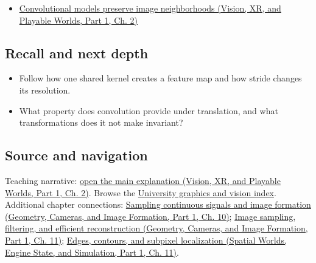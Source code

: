\hypertarget{appendix-47c51ea026fb-full-teaching-explanation}{}

\begin{itemize}
\tightlist
\item
  \href{../07-Vision-XR-and-Playable-Worlds-P01/main.pdf\#nameddest=04-visual-computing-ii-ch031-convolutional-models-preserve-image-neighborhoods}{Convolutional models preserve image neighborhoods (Vision, XR, and Playable Worlds, Part 1, Ch. 2)}
\end{itemize}

\subsection{Recall and next depth}\label{appendix-47c51ea026fb-recall-and-next-depth}

\hypertarget{appendix-47c51ea026fb-recall-and-next-depth}{}

\begin{itemize}
\tightlist
\item
  Follow how one shared kernel creates a feature map and how stride changes its resolution.
\item
  What property does convolution provide under translation, and what transformations does it not make invariant?
\end{itemize}

\subsection{Source and navigation}\label{appendix-47c51ea026fb-source-and-navigation}

\hypertarget{appendix-47c51ea026fb-source-and-navigation}{}

Teaching narrative: \href{../07-Vision-XR-and-Playable-Worlds-P01/main.pdf\#nameddest=04-visual-computing-ii-ch031-convolutional-models-preserve-image-neighborhoods}{open the main explanation (Vision, XR, and Playable Worlds, Part 1, Ch. 2)}. Browse the \hyperref[appendix-a6d556a4ef50-university-graphics-vision-and-photography---independent-series]{University graphics and vision index}. Additional chapter connections: \href{../03-Geometry-Cameras-and-Image-Formation-P01/main.pdf\#nameddest=03-visual-computing-i-ch003-sampling-continuous-signals-and-image-formation}{Sampling continuous signals and image formation (Geometry, Cameras, and Image Formation, Part 1, Ch. 10)}; \href{../03-Geometry-Cameras-and-Image-Formation-P01/main.pdf\#nameddest=03-visual-computing-i-ch004-image-sampling-filtering-and-efficient-reconstruction}{Image sampling, filtering, and efficient reconstruction (Geometry, Cameras, and Image Formation, Part 1, Ch. 11)}; \href{../05-Spatial-Worlds-Engine-State-and-Simulation-P01/main.pdf\#nameddest=04-visual-computing-ii-ch030-edges-contours-and-subpixel-localization}{Edges, contours, and subpixel localization (Spatial Worlds, Engine State, and Simulation, Part 1, Ch. 11)}.

